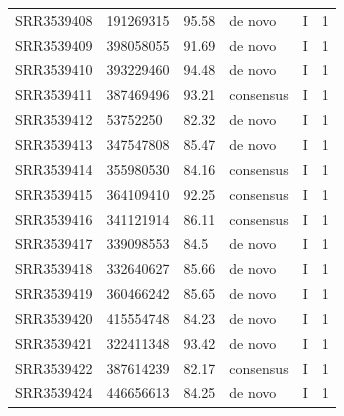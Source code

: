 \begin{longtable}{@{}llllll@{}}
SRR3539408 & 191269315     & 95.58       & de novo      & I        & 1        \\
SRR3539409 & 398058055     & 91.69       & de novo      & I        & 1        \\
SRR3539410 & 393229460     & 94.48       & de novo      & I        & 1        \\
SRR3539411 & 387469496     & 93.21       & consensus    & I        & 1        \\
SRR3539412 & 53752250      & 82.32       & de novo      & I        & 1        \\
SRR3539413 & 347547808     & 85.47       & de novo      & I        & 1        \\
SRR3539414 & 355980530     & 84.16       & consensus    & I        & 1        \\
SRR3539415 & 364109410     & 92.25       & consensus    & I        & 1        \\
SRR3539416 & 341121914     & 86.11       & consensus    & I        & 1        \\
SRR3539417 & 339098553     & 84.5        & de novo      & I        & 1        \\
SRR3539418 & 332640627     & 85.66       & de novo      & I        & 1        \\
SRR3539419 & 360466242     & 85.65       & de novo      & I        & 1        \\
SRR3539420 & 415554748     & 84.23       & de novo      & I        & 1        \\
SRR3539421 & 322411348     & 93.42       & de novo      & I        & 1        \\
SRR3539422 & 387614239     & 82.17       & consensus    & I        & 1        \\
SRR3539424 & 446656613     & 84.25       & de novo      & I        & 1       
\end{longtable}

